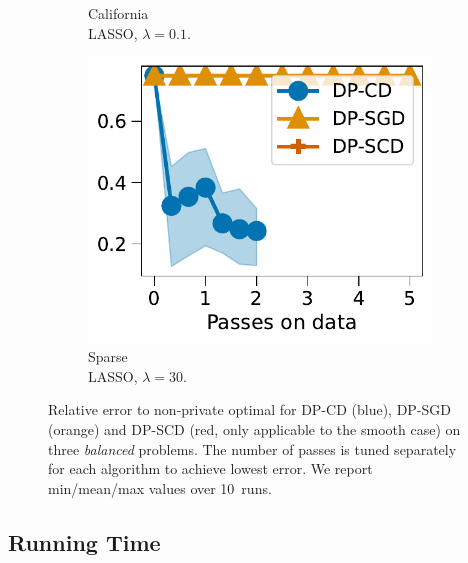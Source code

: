 \begin{figure}[t]
\begin{subfigure}{0.29\linewidth}
    \caption{California\\ LASSO, $\lambda=0.1$.}
    \label{subfig:expe-logreg-power-law}
  \end{subfigure}
  \begin{subfigure}{0.29\linewidth}
    \centering
    \includegraphics[width=\linewidth]{plots/optimization_lasso.pdf}
    \caption{Sparse\\ LASSO, $\lambda=30$.}
    \label{fig:expe-logreg-power-law}
  \end{subfigure}

  \caption{
    Relative error to non-private optimal for  DP-CD (blue), DP-SGD (orange)
    and DP-SCD (red, only applicable to the smooth case) on three
    \emph{balanced} problems. The number of passes is tuned separately for
    each algorithm to achieve lowest error. We report min/mean/max values over
    10~runs.
  }
  \label{fig:expe-standardized}
\end{figure}

\subsection{Running Time}
\label{sec:running-time}

